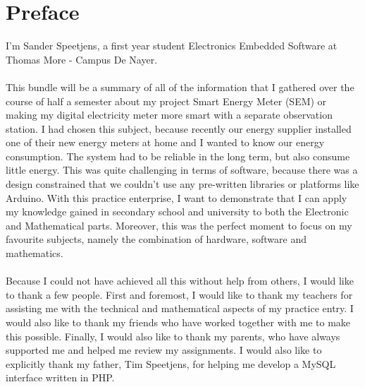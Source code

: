 \documentclass[a4paper,twoside, 12pt]{report}
\theoremstyle{break}
\begin{document}
\chapter*{Preface}
\thispagestyle{empty}
I'm Sander Speetjens, a first year student Electronics Embedded Software at Thomas More - Campus De Nayer.
\ \\ \ \\
This bundle will be a summary of all of the information that I gathered over the course of half a semester about my project Smart Energy Meter (SEM) or making my digital electricity meter more smart with a separate observation station. I had chosen this subject, because recently our energy supplier installed one of their new energy meters at home and I wanted to know our energy consumption. The system had to be reliable in the long term, but also consume little energy. This was quite challenging in terms of software, because there was a design constrained that we couldn't use any pre-written libraries or platforms like Arduino. With this practice enterprise, I want to demonstrate that I can apply my knowledge gained in secondary school and university to both the Electronic and Mathematical parts. Moreover, this was the perfect moment to focus on my favourite subjects, namely the combination of hardware, software and mathematics.
\ \\ \ \\
Because I could not have achieved all this without help from others, I would like to thank a few people. First and foremost, I would like to thank my teachers for assisting me with the technical and mathematical aspects of my practice entry.  I would also like to thank my friends who have worked together with me to make this possible.
Finally, I would also like to thank my parents, who have always supported me and helped me review my assignments.  I would also like to explicitly thank my father, Tim Speetjens, for helping me develop a MySQL interface written in PHP.
\vfill
\eject


\clearpage{\pagestyle{empty}\cleardoublepage}


\setcounter{section}{0}
\setcounter{subsection}{0}

\tableofcontents
\thispagestyle{empty}

\vfill

\eject

\vfill
\end{document}
